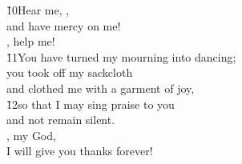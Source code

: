 \begin{poetry}
\poeml \v{10}Hear me, , \\
\poemll    and have mercy on me! \\
\poemlll       {}, help me! \\
\poeml \v{11}You have turned my mourning into dancing; \\
\poemll    you took off my sackcloth \\
\poemlll       and clothed me with a garment of joy, \\
\poeml \v{12}so that I may sing praise to you \\
\poemll    and not remain silent. \\
\poeml {}, my God, \\
\poemll    I will give you thanks forever!
\end{poetry}

